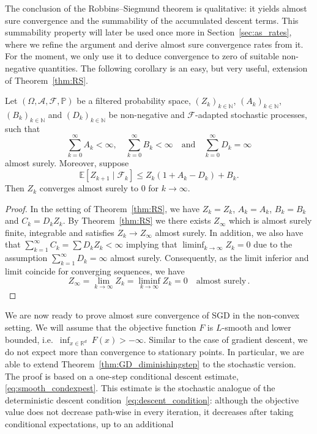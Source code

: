 \documentclass[12pt,openany]{book}
\theoremstyle{definition}
\theoremstyle{definition}
\newcommand{\E}{\mathbb{E}}
\newcommand{\N}{\mathbb{N}}
\newcommand{\R}{\mathbb{R}}
\begin{document}
The conclusion of the Robbins--Siegmund theorem is qualitative: it yields almost sure convergence and the summability of the accumulated descent terms. This summability property will later be
used once more in Section~\ref{sec:as_rates}, where we refine the argument and derive almost sure convergence rates from it. For the moment, we only use it to deduce convergence to zero of suitable non-negative quantities. The following corollary is an easy, but very useful, extension of Theorem~\ref{thm:RS}.
\begin{cor}\label{cor:RS}
Let $(\Omega,\mathcal A,\mathcal F,\mathbb P)$ be a filtered probability space, $(Z_k)_{k\in\N}$, $(A_k)_{k\in\N}$, $(B_k)_{k\in\N}$ and $(D_k)_{k\in\N}$ be non-negative and $\mathcal F$-adapted stochastic processes, such that
\[\sum_{k=0}^\infty A_k<\infty, \quad \sum_{k=0}^\infty B_k<\infty \quad \text{and}\quad \sum_{k=0}^\infty D_k =\infty \]
almost surely. Moreover, suppose
\[\E[Z_{k+1}\mid \mathcal F_k] \le Z_k (1+A_k-D_k) + B_k. \]
Then $Z_k$ converges almost surely to $0$ for $k\to\infty$.
\end{cor}
\begin{proof}
In the setting of Theorem~\ref{thm:RS}, we have $Z_k = Z_k$, $A_k = A_k$, $B_k = B_k$ and $C_k = D_kZ_k$. By Theorem~\ref{thm:RS} we there exists $Z_\infty$ which is almost surely finite, integrable and satisfies $Z_k\to Z_\infty$ almost surely. In addition, we also have that $\sum_{k=1}^\infty C_k = \sum D_k Z_k<\infty$ implying that $\liminf_{k\to\infty} Z_k = 0$ due to the assumption $\sum_{k=1}^\infty D_k = \infty$ almost surely. Consequently, as the limit inferior and limit coincide for converging sequences, we have
     \[ Z_\infty = \lim_{k\to\infty} Z_k = \liminf_{k\to\infty} Z_k = 0\quad \text{almost surely}\,.\]
\end{proof}
We are now ready to prove almost sure convergence of SGD in the non-convex setting. We will assume that the objective function $F$ is $L$-smooth and lower bounded, i.e.~$\inf_{x\in\R^d}\ F(x)>-\infty$. Similar to the case of gradient descent, we do not expect more than convergence to stationary points. In particular, we are able to extend Theorem~\ref{thm:GD_diminishingstep} to the stochastic version. 
The proof is based on a one-step conditional descent estimate, \eqref{eq:smooth_condexpest}. This estimate is the stochastic analogue of the deterministic descent condition~\eqref{eq:descent_condition}: although the objective value does not decrease path-wise in every iteration, it decreases after taking conditional expectations, up to an additional
\end{document}
